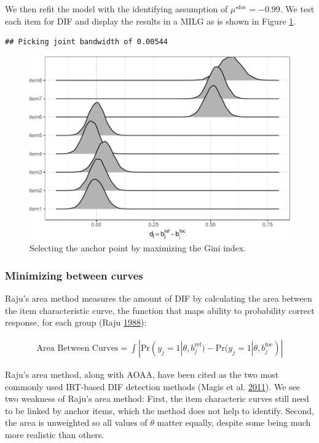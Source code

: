 \documentclass[
  11pt,
]{article}
\begin{document}
We then refit the model with the identifying assumption of \(\mu^{\star\text{foc}} = -0.99\). We test each item for DIF and display the results in a MILG as is shown in Figure \ref{fig:ginimilg}.

\begin{verbatim}
## Picking joint bandwidth of 0.00544
\end{verbatim}

\begin{figure}[H]

{\centering \includegraphics[width=0.7\linewidth]{paper_files/figure-latex/ginimilg-1} 

}

\caption{Selecting the anchor point by maximizing the Gini index.}\label{fig:ginimilg}
\end{figure}

\hypertarget{minimizing-between-curves}{%
\subsubsection{Minimizing between curves}\label{minimizing-between-curves}}

Raju's area method measures the amount of DIF by calculating the area between the item characteristic curve, the function that maps ability to probability correct response, for each group (Raju \protect\hyperlink{ref-raju1988area}{1988}):

\begin{align}
    \text{Area Between Curves} = \int |\text{Pr}(y_j = 1| \theta, b_j^{\text{ref}}) - \text{Pr}(y_j = 1| \theta, b_j^{\text{foc}})|
\end{align}

Raju's area method, along with AOAA, have been cited as the two most commonly used IRT-based DIF detection methods (Magis et al. \protect\hyperlink{ref-magis2011generalized}{2011}). We see two weakness of Raju's area method: First, the item characteric curves still need to be linked by anchor items, which the method does not help to identify. Second, the area is unweighted so all values of \(\theta\) matter equally, despite some being much more realistic than others.
\end{document}
